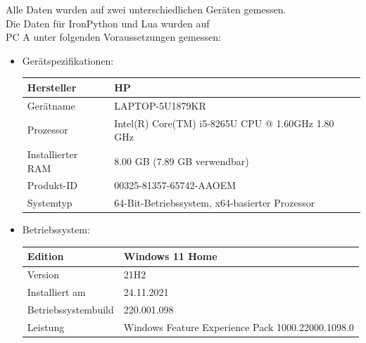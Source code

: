 \newpage
Alle Daten wurden auf zwei unterschiedlichen Geräten gemessen. \\
Die Daten für IronPython und Lua wurden auf \\
PC A unter folgenden Voraussetzungen  gemessen:
\begin{itemize}
    \item Gerätspezifikationen:
    \begin{table}[H]
        \center
        \begin{tabular}{|p{3cm}|p{3cm}|}
            \hline
            Hersteller & HP \\ \hline
            Gerätname & LAPTOP-5U1879KR \\ \hline
            Prozessor & Intel(R) Core(TM) i5-8265U CPU @ 1.60GHz   1.80 GHz \\ \hline
            Installierter RAM & 8.00 GB (7.89 GB verwendbar) \\ \hline
            Produkt-ID & 00325-81357-65742-AAOEM \\ \hline
            Systemtyp & 64-Bit-Betriebssystem, x64-basierter Prozessor \\ \hline
        \end{tabular}
    \end{table}
    \item Betriebssystem:
    \begin{table}[H]
        \center
        \begin{tabular}{|p{4cm}|p{4cm}|}
            \hline
            Edition & Windows 11 Home \\ \hline
            Version & 21H2 \\ \hline
            Installiert am & 24.11.2021 \\ \hline
            Betriebssystembuild & 220.001.098 \\ \hline
            Leistung & Windows Feature Experience Pack 1000.22000.1098.0 \\ \hline
        \end{tabular}        
    \end{table}
\end{itemize}

